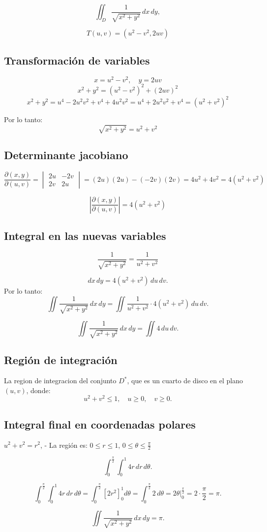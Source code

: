 \[
 \iint_D \frac{1}{\sqrt{x^2 + y^2}} \, dx \, dy,
\]

\[
T(u, v) = (u^2 - v^2, 2uv)
\]

\subsection*{Transformación de variables}

\[
x = u^2 - v^2, \quad y = 2uv
\]
\[
x^2 + y^2 = (u^2 - v^2)^2 + (2uv)^2
\]
\[
x^2 + y^2 = u^4 - 2u^2v^2 + v^4 + 4u^2v^2 = u^4 + 2u^2v^2 + v^4 = (u^2 + v^2)^2
\]

Por lo tanto:
\[
\sqrt{x^2 + y^2} = u^2 + v^2
\]

\subsection*{Determinante jacobiano}


\[
\frac{\partial(x, y)}{\partial(u, v)} =
\begin{vmatrix}
2u & -2v \\
2v & 2u
\end{vmatrix} = (2u)(2u) - (-2v)(2v) = 4u^2 + 4v^2 = 4(u^2 + v^2)
\]


\[
\left| \frac{\partial(x, y)}{\partial(u, v)} \right| = 4(u^2 + v^2)
\]

\subsection*{Integral en las nuevas variables}

\[
\frac{1}{\sqrt{x^2 + y^2}} = \frac{1}{u^2 + v^2}
\]

\[
dx \, dy = 4(u^2 + v^2) \, du \, dv.
\]
Por lo tanto:
\[
\iint \frac{1}{\sqrt{x^2 + y^2}} \, dx \, dy = \iint \frac{1}{u^2 + v^2} \cdot 4(u^2 + v^2) \, du \, dv.
\]

\[
\iint \frac{1}{\sqrt{x^2 + y^2}} \, dx \, dy = \iint 4 \, du \, dv.
\]

\subsection*{Región de integración}
La region de integracion del conjunto \( D^* \), que es un cuarto de disco en el plano \((u, v)\), donde:
\[
u^2 + v^2 \leq 1, \quad u \geq 0, \quad v \geq 0.
\]

\subsection*{Integral final en coordenadas polares}

 \( u^2 + v^2 = r^2 \),
- La región es: \( 0 \leq r \leq 1 \), \( 0 \leq \theta \leq \frac{\pi}{2} \)


\[
\int_0^{\frac{\pi}{2}} \int_0^1 4r \, dr \, d\theta.
\]

\[
\int_0^{\frac{\pi}{2}} \int_0^1 4r \, dr \, d\theta = \int_0^{\frac{\pi}{2}} \left[ 2r^2 \right]_0^1 d\theta = \int_0^{\frac{\pi}{2}} 2 \, d\theta = 2\theta \Big|_0^{\frac{\pi}{2}} = 2 \cdot \frac{\pi}{2} = \pi.
\]


\[
\iint \frac{1}{\sqrt{x^2 + y^2}} \, dx \, dy = \pi.
\]

